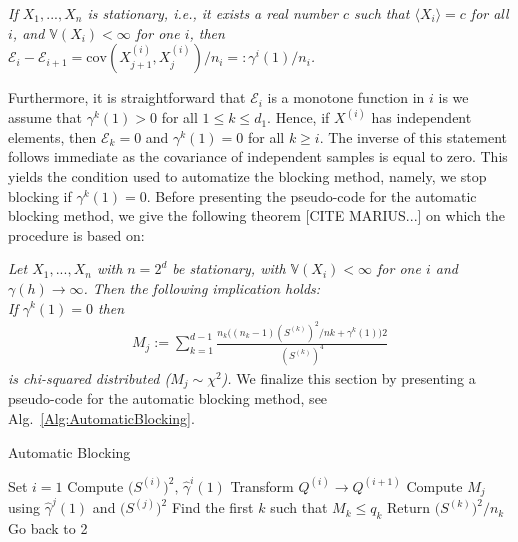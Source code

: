 \documentclass[11pt,a4paper]{article}
\numberwithin{equation}{section}
\begin{document}
{\it If $X_1,...,X_n$ is stationary, i.e., it exists a real number $c$ such that $\langle X_i\rangle=c$ for all $i$, and $\mathbb{V}(X_i)<\infty$ for one $i$, then $\mathcal{E}_i-\mathcal{E}_{i+1}= \mathrm{cov}(X^{(i)}_{j+1},X^{(i)}_j)/n_i=:\gamma^i(1)/n_i$.\\}

Furthermore, it is straightforward that $\mathcal{E}_i$ is a monotone function in $i$ is we assume that $\gamma^k(1)>0$ for all $1\leq k\leq d_1$.
%
Hence, if $X^{(i)}$ has independent elements, then $\mathcal{E}_k=0$ and $\gamma^k(1)=0$ for all $k\geq i$. 
%
The inverse of this statement follows immediate as the covariance of independent samples is equal to zero.
%
This yields the condition used to automatize the blocking method, namely, we stop blocking if $\gamma^k(1)=0$.  
%
Before presenting the pseudo-code for the automatic blocking method, we give the following theorem [CITE MARIUS...] on which the procedure is based on:

{\it 
Let $X_1,...,X_n$ with $n=2^d$ be stationary, with $\mathbb{V}(X_i)<\infty$ for one $i$ and $\gamma(h)\to \infty$.
%
Then the following implication holds:\\
If $\gamma^k(1)=0$ then
\begin{align*}
M_j := \sum_{k=1}^{d-1}\frac{n_k\big((n_k-1)(S^{(k)})^2/nk+\gamma^k(1)\big)2}{(S^{(k)})^4}
\end{align*}
is chi-squared distributed ($M_j\sim\chi^2$).
}
We finalize this section by presenting a pseudo-code for the automatic blocking method, see Alg.~\eqref{Alg:AutomaticBlocking}.

\begin{algorithm}
	\caption{Automatic Blocking}
	\label{Alg:AutomaticBlocking}
	\begin{algorithmic}[1]
		\State Set $i=1$
		\State Compute $\big(S^{(i)}\big)^2, \, \hat\gamma^i(1)$
		\State Transform $Q^{(i)}\to Q^{(i+1)}$
		\State Compute $M_j$ using $\hat{\gamma}^j(1)$ and $\big(S^{(j)}\big)^2$ 
		\State Find the first $k$ such that $M_k\leq q_k$
		\State Return $\big(S^{(k)}\big)^2/n_k$
		\Else
		\State Go back to  2
		\EndIf
		\EndProcedure
	\end{algorithmic}
\end{algorithm}
\end{document}

